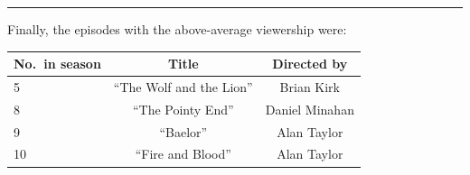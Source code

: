 \documentclass[
  letterpaper,
  DIV=11,
  numbers=noendperiod]{scrartcl}
\begin{document}
\begin{center}\rule{0.5\linewidth}{0.5pt}\end{center}

Finally, the episodes with the above-average viewership were:

\begin{longtable}[]{@{}lcc@{}}
\toprule()
No.~in season & Title & Directed by \\
\midrule()
\endhead
5 & ``The Wolf and the Lion'' & Brian Kirk \\
8 & ``The Pointy End'' & Daniel Minahan \\
9 & ``Baelor'' & Alan Taylor \\
10 & ``Fire and Blood'' & Alan Taylor \\
\bottomrule()
\end{longtable}
\end{document}
